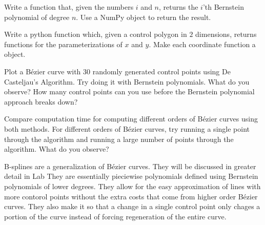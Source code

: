 \begin{problem}
Write a function that, given the numbers $i$ and $n$, returns the $i$'th Bernstein polynomial of degree $n$.
Use a NumPy  object to return the result.
\end{problem}

\begin{problem}
Write a python function which, given a control polygon in $2$ dimensions, returns functions for the parameterizations of $x$ and $y$.
Make each coordinate function a  object.
\end{problem}

\begin{problem}
Plot a B\'{e}zier curve with 30 randomly generated control points using De Casteljau's Algorithm.
Try doing it with Bernstein polynomials.
What do you observe?
How many control points can you use before the Bernstein polynomial approach breaks down?
\end{problem}

\begin{problem}
Compare computation time for computing different orders of B\'{e}zier curves using both methods.
For different orders of B\'{e}zier curves, try running a single point through the algorithm and running a large number of points through the algorithm.
What do you observe?
\end{problem}

B-splines are a generalization of B\'{e}zier curves.
They will be discussed in greater detail in Lab 
They are essentially pieciewise polynomials defined using Bernstein polynomials of lower degrees.
They allow for the easy approximation of lines with more contorol points without the extra costs that come from higher order B\'{e}zier curves.
They also make it so that a change in a single control point only chages a portion of the curve instead of forcing regeneration of the entire curve.

